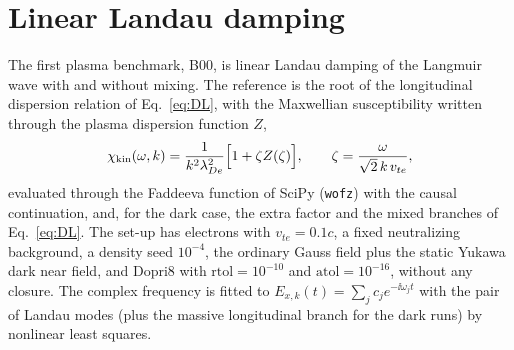 \section{Linear Landau damping}\label{sec:landau}

The first plasma benchmark, B00, is linear Landau damping of the Langmuir wave with and without mixing. The reference is the root of the longitudinal dispersion relation of Eq.~\eqref{eq:DL}, with the Maxwellian susceptibility written through the plasma dispersion function $Z$,
\begin{equation}
\chi_{\rm kin}(\omega,k)=\frac{1}{k^2\lambda_{De}^2}\Big[1+\zeta Z(\zeta)\Big],\qquad \zeta=\frac{\omega}{\sqrt2\,k\,v_{te}},
\label{eq:chikin}
\end{equation}
evaluated through the Faddeeva function of SciPy (\texttt{wofz}) with the causal continuation, and, for the dark case, the extra factor and the mixed branches of Eq.~\eqref{eq:DL}. The set-up has electrons with $v_{te}=0.1c$, a fixed neutralizing background, a density seed $10^{-4}$, the ordinary Gauss field plus the static Yukawa dark near field, and Dopri8 with $\mathrm{rtol}=10^{-10}$ and $\mathrm{atol}=10^{-16}$, without any closure. The complex frequency is fitted to $E_{x,k}(t)=\sum_jc_je^{-\ii\omega_jt}$ with the pair of Landau modes (plus the massive longitudinal branch for the dark runs) by nonlinear least squares.

